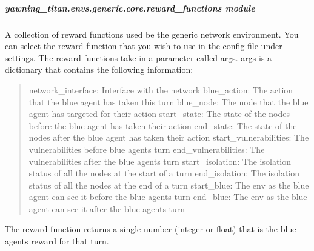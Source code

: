 \documentclass[letterpaper,10pt,english]{sphinxmanual}
\begin{document}
\subparagraph{yawning\_titan.envs.generic.core.reward\_functions module}
\label{\detokenize{source/yawning_titan.envs.generic.core:module-yawning_titan.envs.generic.core.reward_functions}}\label{\detokenize{source/yawning_titan.envs.generic.core:yawning-titan-envs-generic-core-reward-functions-module}}
\sphinxAtStartPar
A collection of reward functions used be the generic network environment. You can select the reward function that you
wish to use in the config file under settings. The reward functions take in a parameter called args. args is a dictionary
that contains the following information:
\begin{quote}

\sphinxAtStartPar
\sphinxhyphen{}network\_interface: Interface with the network
\sphinxhyphen{}blue\_action: The action that the blue agent has taken this turn
\sphinxhyphen{}blue\_node: The node that the blue agent has targeted for their action
\sphinxhyphen{}start\_state: The state of the nodes before the blue agent has taken their action
\sphinxhyphen{}end\_state: The state of the nodes after the blue agent has taken their action
\sphinxhyphen{}start\_vulnerabilities: The vulnerabilities before blue agents turn
\sphinxhyphen{}end\_vulnerabilities: The vulnerabilities after the blue agents turn
\sphinxhyphen{}start\_isolation: The isolation status of all the nodes at the start of a turn
\sphinxhyphen{}end\_isolation: The isolation status of all the nodes at the end of a turn
\sphinxhyphen{}start\_blue: The env as the blue agent can see it before the blue agents turn
\sphinxhyphen{}end\_blue: The env as the blue agent can see it after the blue agents turn
\end{quote}

\sphinxAtStartPar
The reward function returns a single number (integer or float) that is the blue agents reward for that turn.
\end{document}
